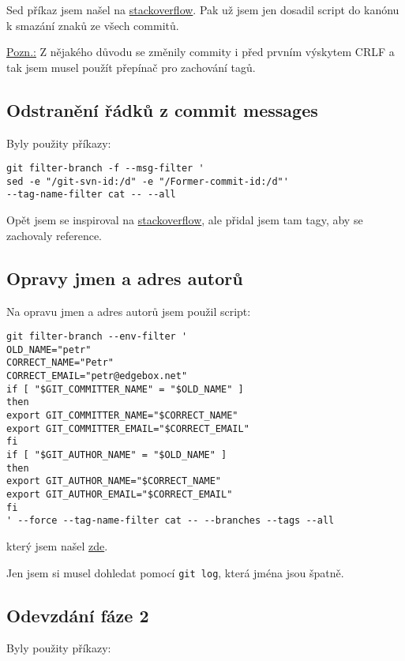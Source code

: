 \documentclass[titlepage]{article}
\begin{document}
Sed příkaz jsem našel na \href{https://stackoverflow.com/questions/2613800/how-to-convert-dos-windows-newline-crlf-to-unix-newline-lf-in-a-bash-script}{stackoverflow}.
Pak už jsem jen dosadil script do kanónu k smazání znaků ze všech commitů.

\underline{Pozn.:} Z nějakého důvodu se změnily commity i před prvním výskytem CRLF a tak jsem musel použít přepínač pro zachování tagů.


\subsection{Odstranění řádků  z commit messages}
Byly použity příkazy:

\begin{verbatim}
git filter-branch -f --msg-filter '
sed -e "/git-svn-id:/d" -e "/Former-commit-id:/d"'
--tag-name-filter cat -- --all
\end{verbatim}

Opět jsem se inspiroval na \href{https://stackoverflow.com/questions/16092509/how-to-remove-svn-url-from-commit-messages?utm_medium=organic&utm_source=google_rich_qa&utm_campaign=google_rich_qa}{stackoverflow}, ale přidal jsem tam tagy, aby se zachovaly reference.


\subsection{Opravy jmen a adres autorů}
Na opravu jmen a adres autorů jsem použil script:

\begin{verbatim}
git filter-branch --env-filter '
OLD_NAME="petr"
CORRECT_NAME="Petr"
CORRECT_EMAIL="petr@edgebox.net"
if [ "$GIT_COMMITTER_NAME" = "$OLD_NAME" ]
then
export GIT_COMMITTER_NAME="$CORRECT_NAME"
export GIT_COMMITTER_EMAIL="$CORRECT_EMAIL"
fi
if [ "$GIT_AUTHOR_NAME" = "$OLD_NAME" ]
then
export GIT_AUTHOR_NAME="$CORRECT_NAME"
export GIT_AUTHOR_EMAIL="$CORRECT_EMAIL"
fi
' --force --tag-name-filter cat -- --branches --tags --all
\end{verbatim}

který jsem našel \href{https://help.github.com/articles/changing-author-info/}{zde}.

Jen jsem si musel dohledat pomocí \texttt{git log}, která jména jsou špatně.


\subsection{Odevzdání fáze 2}
Byly použity příkazy:
\end{document}
